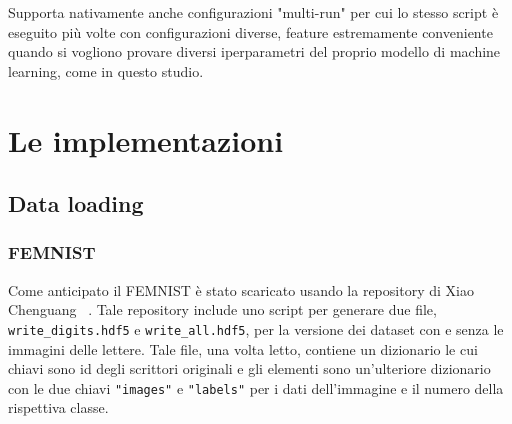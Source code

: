 Supporta nativamente anche configurazioni "multi-run" per cui lo stesso 
script è eseguito più volte con configurazioni diverse, feature 
estremamente conveniente quando si vogliono provare diversi iperparametri
del proprio modello di machine learning, come in questo studio.

\section{Le implementazioni}

\subsection{Data loading}
\subsubsection{FEMNIST}
Come anticipato il FEMNIST è stato scaricato usando la repository di 
Xiao Chenguang ~\cite{femnist_hdf5}. Tale repository include uno script 
per generare due file, \texttt{write\_digits.hdf5} e \texttt{write\_all.hdf5},
per la versione dei dataset con e senza le immagini delle lettere.
Tale file, una volta letto, contiene un dizionario le cui chiavi sono 
id degli scrittori originali e gli elementi sono un'ulteriore dizionario 
con le due chiavi \texttt{"images"} e \texttt{"labels"} per i dati 
dell'immagine e il numero della rispettiva classe.


